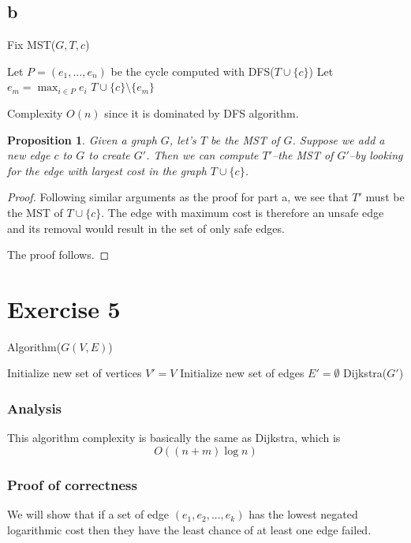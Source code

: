 \documentclass[a4paper,10pt,twoside]{article}
\newtheorem{proof}{Proof}
\newtheorem{proposition}{Proposition}
\begin{document}
\subsection*{b}
\begin{algorithm}[H]
	\caption{Fix MST($G, T, c$)}
	Let $P=(e_1, ..., e_n)$ be the cycle computed with DFS($T \cup \{c\}$)\;
	Let $e_m = \max_{i\in P} e_i$\;
	\Return $T \cup \{c\} \setminus \{e_m\}$ 

\end{algorithm}

Complexity $O(n)$ since it is dominated by DFS algorithm.

\begin{proposition}
	Given a graph $G$, let's $T$ be the MST of $G$. Suppose we add a new edge
	$c$ to $G$ to create $G'$. Then we can compute $T'$--the MST of $G'$--by looking
	for the edge with largest cost in the graph $T\cup \{c\}$.
\end{proposition}
\begin{proof}
	Following similar arguments as the proof for part a, we see that $T'$ must be
	the MST of $T \cup \{c\}$. The edge with maximum cost is therefore an unsafe edge
	and its removal would result in the set of only safe edges. 

	The proof follows.	
\end{proof}


\section*{Exercise 5}
\begin{algorithm}[H]
	\caption{Algorithm($G(V, E)$)}
	Initialize new set of vertices $V' = V$\;
	Initialize new set of edges $E' = \emptyset$\; 
	\Return Dijkstra($G'$)
\end{algorithm}

\subsubsection*{Analysis}
This algorithm complexity is basically the same as Dijkstra, which is 
$$O((n + m)\log n)$$

\subsubsection*{Proof of correctness}
We will show that if a set of edge $(e_1, e_2, ..., e_k)$ has the lowest
negated logarithmic cost then they have the least chance of at least
one edge failed.
\end{document}
